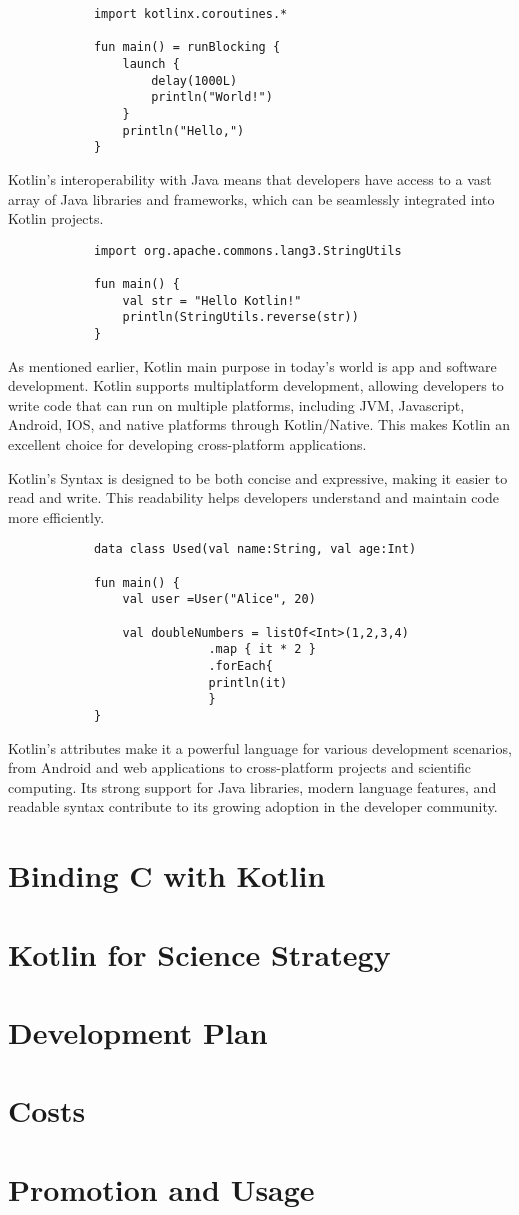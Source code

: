 \documentclass[10pt,twocolumn, a4paper]{article}
\begin{document}
		\begin{lstlisting}
			import kotlinx.coroutines.*

			fun main() = runBlocking {
				launch {
					delay(1000L)
					println("World!")
				}
				println("Hello,")
			}
		\end{lstlisting}

		Kotlin's interoperability with Java means that developers have access to a vast array of Java libraries and frameworks, which can be seamlessly integrated into Kotlin projects.

		\begin{lstlisting}
			import org.apache.commons.lang3.StringUtils

			fun main() {
				val str = "Hello Kotlin!"
				println(StringUtils.reverse(str))
			}
		\end{lstlisting}

		As mentioned earlier, Kotlin main purpose in today's world is app and software development. Kotlin supports multiplatform development, allowing developers to write code that can run on multiple platforms, including JVM, Javascript, Android, IOS, and native platforms through Kotlin/Native. This makes Kotlin an excellent choice for developing cross-platform applications.

		Kotlin's Syntax is designed to be both concise and expressive, making it easier to read and write. This readability helps developers understand and maintain code more efficiently.

		\begin{lstlisting}
			data class Used(val name:String, val age:Int)

			fun main() {
				val user =User("Alice", 20)
			
				val doubleNumbers = listOf<Int>(1,2,3,4)
							.map { it * 2 }
							.forEach{
							println(it)
							}
			}
		\end{lstlisting}
		
		Kotlin's attributes make it a powerful language for various development scenarios, from Android and web applications to cross-platform projects and scientific computing. Its strong support for Java libraries, modern language features, and readable syntax contribute to its growing adoption in the developer community.
		

	\section{Binding C with Kotlin}
	\section{Kotlin for Science Strategy}
	\section{Development Plan}
	\section{Costs}
	\section{Promotion and Usage}
\end{document}
